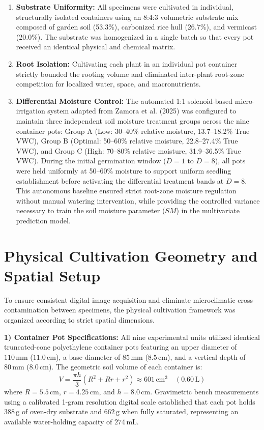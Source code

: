 \begin{enumerate}
    \item \textbf{Substrate Uniformity:} All specimens were cultivated in individual, structurally isolated containers using an 8:4:3 volumetric substrate mix composed of garden soil (53.3\%), carbonized rice hull (26.7\%), and vermicast (20.0\%). The substrate was homogenized in a single batch so that every pot received an identical physical and chemical matrix.
    \item \textbf{Root Isolation:} Cultivating each plant in an individual pot container strictly bounded the rooting volume and eliminated inter-plant root-zone competition for localized water, space, and macronutrients.
    \item \textbf{Differential Moisture Control:} The automated 1:1 solenoid-based micro-irrigation system adapted from Zamora et al. (2025) was configured to maintain three independent soil moisture treatment groups across the nine container pots: Group A (Low: 30--40\% relative moisture, 13.7--18.2\% True VWC), Group B (Optimal: 50--60\% relative moisture, 22.8--27.4\% True VWC), and Group C (High: 70--80\% relative moisture, 31.9--36.5\% True VWC). During the initial germination window ($D = 1$ to $D = 8$), all pots were held uniformly at 50--60\% moisture to support uniform seedling establishment before activating the differential treatment bands at $D = 8$. This autonomous baseline ensured strict root-zone moisture regulation without manual watering intervention, while providing the controlled variance necessary to train the soil moisture parameter ($SM$) in the multivariate prediction model.
\end{enumerate}

\section{Physical Cultivation Geometry and Spatial Setup}

To ensure consistent digital image acquisition and eliminate microclimatic cross-contamination between specimens, the physical cultivation framework was organized according to strict spatial dimensions.

\textbf{1) Container Pot Specifications:} All nine experimental units utilized identical truncated-cone polyethylene container pots featuring an upper diameter of $110\,\mathrm{mm}$ ($11.0\,\mathrm{cm}$), a base diameter of $85\,\mathrm{mm}$ ($8.5\,\mathrm{cm}$), and a vertical depth of $80\,\mathrm{mm}$ ($8.0\,\mathrm{cm}$). The geometric soil volume of each container is:
\begin{equation}
V = \frac{\pi h}{3} \left(R^2 + Rr + r^2\right) \approx 601\,\mathrm{cm}^3 \quad (0.60\,\mathrm{L})
\label{eq:pot_volume}
\end{equation}
where $R = 5.5\,\mathrm{cm}$, $r = 4.25\,\mathrm{cm}$, and $h = 8.0\,\mathrm{cm}$. Gravimetric bench measurements using a calibrated 1-gram resolution digital scale established that each pot holds $388\,\mathrm{g}$ of oven-dry substrate and $662\,\mathrm{g}$ when fully saturated, representing an available water-holding capacity of $274\,\mathrm{mL}$.

